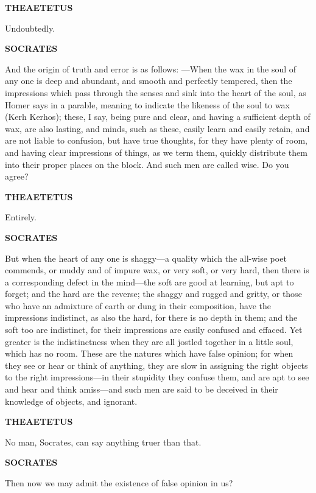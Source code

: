 \documentclass[11pt,letter]{article}
\begin{document}
\par \textbf{THEAETETUS}
\par   Undoubtedly.

\par \textbf{SOCRATES}
\par   And the origin of truth and error is as follows: —When the wax in the soul of any one is deep and abundant, and smooth and perfectly tempered, then the impressions which pass through the senses and sink into the heart of the soul, as Homer says in a parable, meaning to indicate the likeness of the soul to wax (Kerh Kerhos); these, I say, being pure and clear, and having a sufficient depth of wax, are also lasting, and minds, such as these, easily learn and easily retain, and are not liable to confusion, but have true thoughts, for they have plenty of room, and having clear impressions of things, as we term them, quickly distribute them into their proper places on the block. And such men are called wise. Do you agree?

\par \textbf{THEAETETUS}
\par   Entirely.

\par \textbf{SOCRATES}
\par   But when the heart of any one is shaggy—a quality which the all-wise poet commends, or muddy and of impure wax, or very soft, or very hard, then there is a corresponding defect in the mind—the soft are good at learning, but apt to forget; and the hard are the reverse; the shaggy and rugged and gritty, or those who have an admixture of earth or dung in their composition, have the impressions indistinct, as also the hard, for there is no depth in them; and the soft too are indistinct, for their impressions are easily confused and effaced. Yet greater is the indistinctness when they are all jostled together in a little soul, which has no room. These are the natures which have false opinion; for when they see or hear or think of anything, they are slow in assigning the right objects to the right impressions—in their stupidity they confuse them, and are apt to see and hear and think amiss—and such men are said to be deceived in their knowledge of objects, and ignorant.

\par \textbf{THEAETETUS}
\par   No man, Socrates, can say anything truer than that.

\par \textbf{SOCRATES}
\par   Then now we may admit the existence of false opinion in us?
\end{document}
